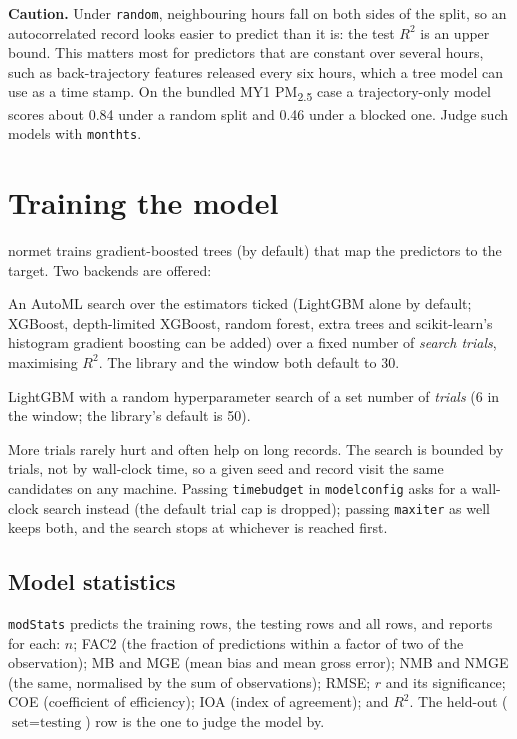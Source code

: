 \documentclass[11pt]{report}
\newcommand{\nosep}{\setlength{\itemsep}{0pt}\setlength{\parskip}{0pt}\setlength{\topsep}{2pt}}
\newcommand{\nm}{\textsf{normet}}
\newcommand{\codeunderscore}{\textunderscore\allowbreak}
\newcommand{\code}[1]{\texttt{\let\_\codeunderscore #1}}
\newcommand{\PMtwo}{PM\textsubscript{2.5}}
\newcommand{\caution}[1]{\par\noindent\colorbox{warn!15}{\parbox{0.97\linewidth}{\small\textbf{Caution.} #1}}\par}
\begin{document}
\caution{Under \code{random}, neighbouring hours fall on both sides of the split, so an
autocorrelated record looks easier to predict than it is: the test $R^2$ is an upper
bound. This matters most for predictors that are constant over several hours, such as
back-trajectory features released every six hours, which a tree model can use as a time
stamp. On the bundled MY1 \PMtwo{} case a trajectory-only model scores about 0.84 under a
random split and 0.46 under a blocked one. Judge such models with \code{month\_ts}.}

\section{Training the model}\label{sec:train}
\nm{} trains gradient-boosted trees (by default) that map the predictors to the target.
Two backends are offered:
\begin{description}\nosep
  \item[FLAML] An AutoML search over the estimators ticked (LightGBM alone by default;
        XGBoost, depth-limited XGBoost, random forest, extra trees and scikit-learn's
        histogram gradient boosting can be added) over a fixed number of \emph{search
        trials}, maximising $R^2$. The library and the window both default to 30.
  \item[LightGBM] LightGBM with a random hyperparameter search of a set number of
        \emph{trials} (6 in the window; the library's default is 50).
\end{description}
More trials rarely hurt and often help on long records. The search is bounded by trials,
not by wall-clock time, so a given seed and record visit the same candidates on any
machine. Passing \code{time\_budget} in \code{model\_config} asks for a wall-clock search
instead (the default trial cap is dropped); passing \code{max\_iter} as well keeps both,
and the search stops at whichever is reached first.

\subsection{Model statistics}\label{sec:modstats}
\code{modStats} predicts the training rows, the testing rows and all rows, and reports
for each: $n$; FAC2 (the fraction of predictions within a factor of two of the
observation); MB and MGE (mean bias and mean gross error); NMB and NMGE (the same,
normalised by the sum of observations); RMSE; $r$ and its significance; COE (coefficient
of efficiency); IOA (index of agreement); and $R^2$. The held-out ($\text{set} =
\text{testing}$) row is the one to judge the model by.
\end{document}
